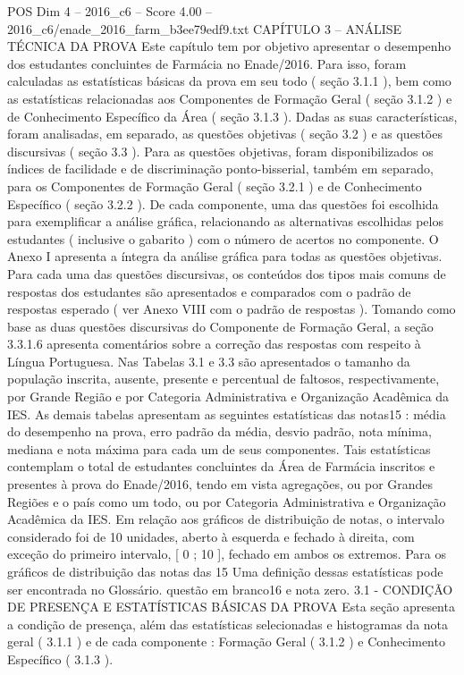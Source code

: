 \begin{textsample}{POS Dim 4 – 2016\_c6 – Score 4.00 – 2016\_c6/enade\_2016\_farm\_b3ee79edf9.txt}  \label{ex:f4_pos_058}
CAPÍTULO 3 – ANÁLISE TÉCNICA DA PROVA Este capítulo tem por objetivo apresentar o desempenho dos estudantes concluintes de Farmácia no Enade/2016.
Para isso, foram calculadas as estatísticas básicas da prova em seu todo ( seção 3.1.1 ), bem como as estatísticas relacionadas aos Componentes de Formação Geral ( seção 3.1.2 ) e de Conhecimento Específico da Área ( seção 3.1.3 ).
Dadas as suas características, foram analisadas, em separado, as questões objetivas ( seção 3.2 ) e as questões discursivas ( seção 3.3 ).
Para as questões objetivas, foram disponibilizados os índices de facilidade e de discriminação ponto-bisserial, também em separado, para os Componentes de Formação Geral ( seção 3.2.1 ) e de Conhecimento Específico ( seção 3.2.2 ).
De cada componente, uma das questões foi escolhida para exemplificar a análise gráfica, relacionando as alternativas escolhidas pelos estudantes ( inclusive o gabarito ) com o número de acertos no componente.
O Anexo I apresenta a íntegra da análise gráfica para todas as questões objetivas.
Para cada uma das questões discursivas, os conteúdos dos tipos mais comuns de respostas dos estudantes são apresentados e comparados com o padrão de respostas esperado ( ver Anexo VIII com o padrão de respostas ).
Tomando como base as duas questões discursivas do Componente de Formação Geral, a seção 3.3.1.6 apresenta comentários sobre a correção das respostas com respeito à Língua Portuguesa.
Nas Tabelas 3.1 e 3.3 são apresentados o tamanho da população inscrita, ausente, presente e percentual de faltosos, respectivamente, por Grande Região e por Categoria Administrativa e Organização Acadêmica da IES.
As demais tabelas apresentam as seguintes estatísticas das notas15 : média do desempenho na prova, erro padrão da média, desvio padrão, nota mínima, mediana e nota máxima para cada um de seus componentes.
Tais estatísticas contemplam o total de estudantes concluintes da Área de Farmácia inscritos e presentes à prova do Enade/2016, tendo em vista agregações, ou por Grandes Regiões e o país como um todo, ou por Categoria Administrativa e Organização Acadêmica da IES.
Em relação aos gráficos de distribuição de notas, o intervalo considerado foi de 10 unidades, aberto à esquerda e fechado à direita, com exceção do primeiro intervalo, [ 0 ; 10 ], fechado em ambos os extremos.
Para os gráficos de distribuição das notas das 15 Uma definição dessas estatísticas pode ser encontrada no Glossário. questão em branco16 e nota zero. 3.1 - CONDIÇÃO DE PRESENÇA E ESTATÍSTICAS BÁSICAS DA PROVA Esta seção apresenta a condição de presença, além das estatísticas selecionadas e histogramas da nota geral ( 3.1.1 ) e de cada componente : Formação Geral ( 3.1.2 ) e Conhecimento Específico ( 3.1.3 ).

\end{textsample}
